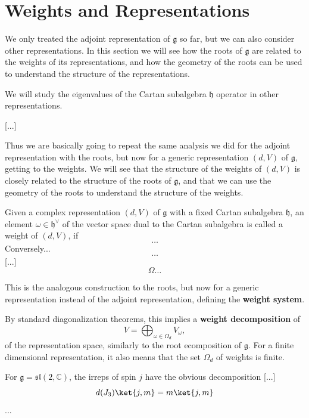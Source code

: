\section{Weights and Representations}

We only treated the adjoint representation of \(\mathfrak{g}\) so far, but we can also consider other representations. In this section we will see how the roots of \(\mathfrak{g}\) are related to the weights of its representations, and how the geometry of the roots can be used to understand the structure of the representations.

We will study the eigenvalues of the Cartan subalgebra \(\mathfrak{h}\) operator in other representations.

    [...]

Thus we are basically going to repeat the same analysis we did for the adjoint representation with the roots, but now for a generic representation \((d,V)\) of \(\mathfrak{g}\), getting to the weights. We will see that the structure of the weights of \((d,V)\) is closely related to the structure of the roots of \(\mathfrak{g}\), and that we can use the geometry of the roots to understand the structure of the weights.

\begin{definition}
    Given a complex representation \((d,V)\) of \(\mathfrak{g}\) with a fixed Cartan subalgebra \(\mathfrak{h}\), an element \(\omega \in \mathfrak{h}^\vee\) of the vector space dual to the Cartan subalgebra is called a weight of \((d,V)\), if
    \[
        \dots
    \]
    Conversely...
    \[
        \dots
    \]
    [...]
    \[
        \Omega\dots
    \]

\end{definition}
This is the analogous construction to the roots, but now for a generic representation instead of the adjoint representation, defining the \textbf{weight system}.

By standard diagonalization theorems, this implies a \textbf{weight decomposition} of
\[
    V = \bigoplus_{\omega \in \Omega_d} V_\omega,
\]
of the representation space, similarly to the root  ecomposition of \(\mathfrak{g}\). For a finite dimensional representation, it also means that the set \(\Omega_d\) of weights is finite.

\begin{example}[\(\mathfrak{g} = \mathfrak{sl}(2, \mathbb{C})\)]
    For \(\mathfrak{g}= \mathfrak{sl}(2, \mathbb{C})\), the irreps of spin \(j\) have the obvious decomposition
        [...]
    \[
        d(J_3) \ket{j,m} = m \ket{j,m}
    \]
    ...
\end{example}

